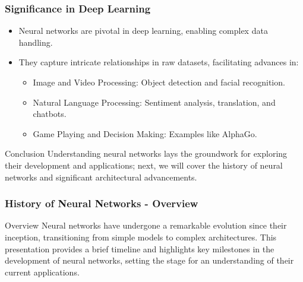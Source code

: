 \documentclass{beamer}
\begin{document}
\begin{frame}[fragile]
    \frametitle{Significance in Deep Learning}
    
    \begin{itemize}
        \item Neural networks are pivotal in deep learning, enabling complex data handling.
        \item They capture intricate relationships in raw datasets, facilitating advances in:
        \begin{itemize}
            \item Image and Video Processing: Object detection and facial recognition.
            \item Natural Language Processing: Sentiment analysis, translation, and chatbots.
            \item Game Playing and Decision Making: Examples like AlphaGo.
        \end{itemize}
    \end{itemize}
    
    \begin{block}{Conclusion}
        Understanding neural networks lays the groundwork for exploring their development and applications; next, we will cover the history of neural networks and significant architectural advancements.
    \end{block}
\end{frame}

\begin{frame}[fragile]
    \frametitle{History of Neural Networks - Overview}
    \begin{block}{Overview}
        Neural networks have undergone a remarkable evolution since their inception, transitioning from simple models to complex architectures. This presentation provides a brief timeline and highlights key milestones in the development of neural networks, setting the stage for an understanding of their current applications.
    \end{block}
\end{frame}
\end{document}
